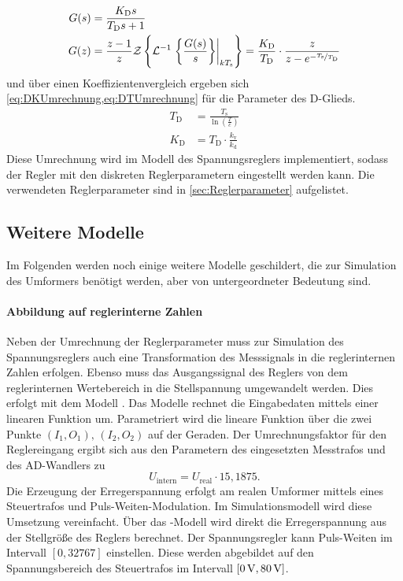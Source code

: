 \begin{align}
	G(s) &= \frac{K_\mathrm{D}s}{T_\mathrm{D}s+1}\label{eq:SD}\\
	G(z) &= \frac{z-1}{z} \mathcal{Z}\left\{ \mathcal{L}^{-1}\left.\left\{\frac{G(s)}{s}\right\}\right|_{kT_{\mathrm{s}}} \right\} = \frac{K_\mathrm{D}}{T_\mathrm{D}}\cdot\frac{z}{z-e^{-\nicefrac{T_\mathrm{s}}{T_\mathrm{D}}}}\label{eq:ZD}
\end{align}
und über einen Koeffizientenvergleich ergeben sich \cref{eq:DKUmrechnung,eq:DTUmrechnung} für die Parameter des D-Glieds.
\begin{align}
	T_\mathrm{D} &= \frac{T_\mathrm{s}}{\ln(\frac{T}{c})}\label{eq:DTUmrechnung}\\
	K_\mathrm{D} &= T_\mathrm{D}\cdot\frac{k_\mathrm{v}}{k_\mathrm{d}}\label{eq:DKUmrechnung}
\end{align}
Diese Umrechnung wird im Modell des Spannungsreglers implementiert, sodass der Regler mit den diskreten Reglerparametern eingestellt werden kann. Die verwendeten Reglerparameter sind in \cref{sec:Reglerparameter} aufgelistet.

\subsection{Weitere Modelle}\label{sec:WeitereModelle}
Im Folgenden werden noch einige weitere Modelle geschildert, die zur Simulation des Umformers benötigt werden, aber von untergeordneter Bedeutung sind.

\paragraph{Abbildung auf reglerinterne Zahlen}
\label{sec:AbbildungReglerZahlen}
Neben der Umrechnung der Reglerparameter muss zur Simulation des Spannungsreglers auch eine Transformation des Messsignals in die reglerinternen Zahlen erfolgen. Ebenso muss das Ausgangssignal des Reglers von dem reglerinternen Wertebereich in die Stellspannung umgewandelt werden. Dies erfolgt mit dem Modell . Das Modelle rechnet die Eingabedaten mittels einer linearen Funktion um. Parametriert wird die lineare Funktion über die zwei Punkte $(I_1,O_1),\,(I_2,O_2)$ auf der Geraden. Der Umrechnungsfaktor für den Reglereingang ergibt sich aus den Parametern des eingesetzten Messtrafos und des AD-Wandlers zu
\begin{equation}
	U_\mathrm{intern} = U_\mathrm{real}\cdot 15,1875.
\end{equation}
Die Erzeugung der Erregerspannung erfolgt am realen Umformer mittels eines Steuertrafos und Puls-Weiten-Modulation. Im Simulationsmodell wird diese Umsetzung vereinfacht. Über das -Modell wird direkt die Erregerspannung aus der Stellgröße des Reglers berechnet. Der Spannungsregler kann Puls-Weiten im Intervall $[0,32767]$ einstellen. Diese werden abgebildet auf den Spannungsbereich des Steuertrafos im Intervall $[\unit[0]{V},\unit[80]{V}]$. %

